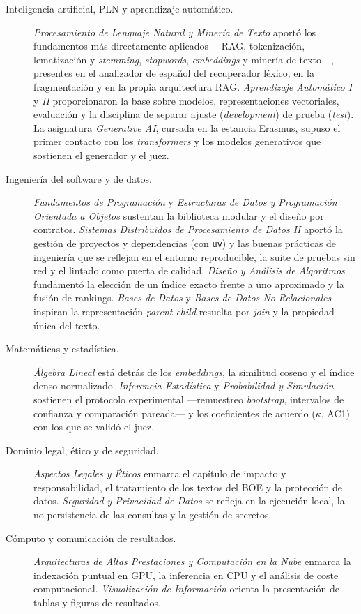 \begin{description}
  \item[Inteligencia artificial, PLN y aprendizaje automático.] \emph{Procesamiento de Lenguaje Natural y Minería de Texto} aportó los fundamentos más directamente aplicados —RAG, tokenización, lematización y \emph{stemming}, \emph{stopwords}, \emph{embeddings} y minería de texto—, presentes en el analizador de español del recuperador léxico, en la fragmentación y en la propia arquitectura RAG. \emph{Aprendizaje Automático I} y \emph{II} proporcionaron la base sobre modelos, representaciones vectoriales, evaluación y la disciplina de separar ajuste (\emph{development}) de prueba (\emph{test}). La asignatura \emph{Generative AI}, cursada en la estancia Erasmus, supuso el primer contacto con los \emph{transformers} y los modelos generativos que sostienen el generador y el juez.

  \item[Ingeniería del software y de datos.] \emph{Fundamentos de Programación} y \emph{Estructuras de Datos y Programación Orientada a Objetos} sustentan la biblioteca modular y el diseño por contratos. \emph{Sistemas Distribuidos de Procesamiento de Datos II} aportó la gestión de proyectos y dependencias (con \texttt{uv}) y las buenas prácticas de ingeniería que se reflejan en el entorno reproducible, la suite de pruebas sin red y el lintado como puerta de calidad. \emph{Diseño y Análisis de Algoritmos} fundamentó la elección de un índice exacto frente a uno aproximado y la fusión de rankings. \emph{Bases de Datos} y \emph{Bases de Datos No Relacionales} inspiran la representación \emph{parent-child} resuelta por \emph{join} y la propiedad única del texto.

  \item[Matemáticas y estadística.] \emph{Álgebra Lineal} está detrás de los \emph{embeddings}, la similitud coseno y el índice denso normalizado. \emph{Inferencia Estadística} y \emph{Probabilidad y Simulación} sostienen el protocolo experimental —remuestreo \emph{bootstrap}, intervalos de confianza y comparación pareada— y los coeficientes de acuerdo ($\kappa$, AC1) con los que se validó el juez.

  \item[Dominio legal, ético y de seguridad.] \emph{Aspectos Legales y Éticos} enmarca el capítulo de impacto y responsabilidad, el tratamiento de los textos del BOE y la protección de datos. \emph{Seguridad y Privacidad de Datos} se refleja en la ejecución local, la no persistencia de las consultas y la gestión de secretos.

  \item[Cómputo y comunicación de resultados.] \emph{Arquitecturas de Altas Prestaciones y Computación en la Nube} enmarca la indexación puntual en GPU, la inferencia en CPU y el análisis de coste computacional. \emph{Visualización de Información} orienta la presentación de tablas y figuras de resultados.
\end{description}

